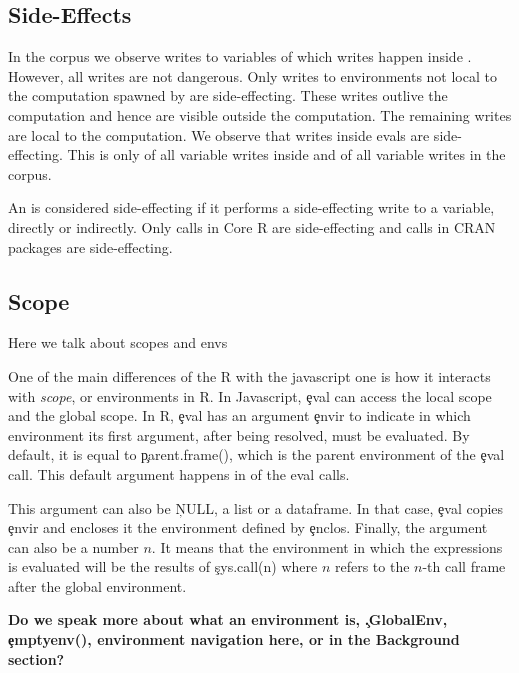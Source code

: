 \documentclass[conference]{IEEEtran}
\begin{document}
\subsection{Side-Effects}

In the corpus we observe \AllWritesRnd writes to variables of which
\EvalWritesRnd writes happen inside \eval. However, all writes are not
dangerous. Only writes to environments not local to the computation spawned
by \eval are side-effecting. These writes outlive the computation and hence are
visible outside the computation. The remaining writes are local to the
computation. We observe that \EvalSideEffectingWritesRnd writes inside evals are
side-effecting. This is only \EvalSideEffectingWritesEvalPerc of all variable
writes inside \eval and \EvalSideEffectingWritesAllPerc of all variable writes
in the corpus.

An \eval is considered side-effecting if it performs a side-effecting write to a
variable, directly or indirectly. Only \SideEffectingCoreCallPerc \eval calls in
Core R are side-effecting and \SideEffectingPackageCallPerc \eval calls in CRAN
packages are side-effecting.

\subsection{Scope}

Here we talk about scopes and envs

One of the main differences of the R \eval with the javascript one is how it
interacts with \emph{scope}, or environments in R. In Javascript, \c{eval}
can access the local scope and the global scope. In R, \c{eval} has an
argument \c{envir} to indicate in which environment its first argument,
after being resolved, must be evaluated. By default, it is equal to \c{parent.frame()}, which is the parent environment of the \c{eval} call. This default argument happens in \DefaultEnvirExprPercent of the eval calls.

This argument can also be \c{NULL}, a list or a dataframe. In that case, \c{eval} copies \c{envir} and encloses it the environment defined by \c{enclos}. Finally, the argument can also be a number $n$. It means that the environment in which the expressions is evaluated will be the results of \c{sys.call(n)} where $n$ refers to the $n$-th call frame after the global environment.

\textbf{Do we speak more about what an environment is, \c{.GlobalEnv}, \c{emptyenv()}, environment navigation here, or in the Background section?}
\end{document}
